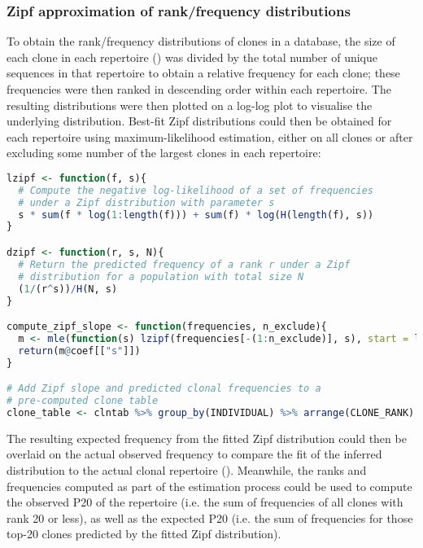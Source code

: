 \subsubsection{Zipf approximation of rank/frequency distributions}
\label{sec:methods_comp_igdownstream_zipf}

To obtain the rank/frequency distributions of clones in a  database, the size of each clone in each repertoire () was divided by the total number of unique sequences in that repertoire to obtain a relative frequency for each clone; these frequencies were then ranked in descending order within each repertoire. The resulting distributions were then plotted on a log-log plot to visualise the underlying distribution. Best-fit Zipf distributions could then be obtained for each repertoire using maximum-likelihood estimation, either on all clones or after excluding some number of the largest clones in each repertoire:

\begin{lstlisting}[language=R]
lzipf <- function(f, s){
  # Compute the negative log-likelihood of a set of frequencies
  # under a Zipf distribution with parameter s
  s * sum(f * log(1:length(f))) + sum(f) * log(H(length(f), s))
}

dzipf <- function(r, s, N){
  # Return the predicted frequency of a rank r under a Zipf 
  # distribution for a population with total size N
  (1/(r^s))/H(N, s)
}

compute_zipf_slope <- function(frequencies, n_exclude){
  m <- mle(function(s) lzipf(frequencies[-(1:n_exclude)], s), start = list(s=1))
  return(m@coef[["s"]])
}

# Add Zipf slope and predicted clonal frequencies to a
# pre-computed clone table
clone_table <- clntab %>% group_by(INDIVIDUAL) %>% arrange(CLONE_RANK) %>% mutate(S = compute_zipf_slope(CLONE_SIZE, n_exclude), EXP_FREQUENCY = dzipf(CLONE_RANK, S, n()), EXP_SIZE = sum(CLONE_SIZE) * EXP_FREQUENCY))
\end{lstlisting}

\noindent The resulting expected frequency from the fitted Zipf distribution could then be overlaid on the actual observed frequency to compare the fit of the inferred distribution to the actual clonal repertoire (). Meanwhile, the ranks and frequencies computed as part of the estimation process could be used to compute the observed P20 of the repertoire (i.e. the sum of frequencies of all clones with rank 20 or less), as well as the expected P20 (i.e. the sum of frequencies for those top-20 clones predicted by the fitted Zipf distribution).


